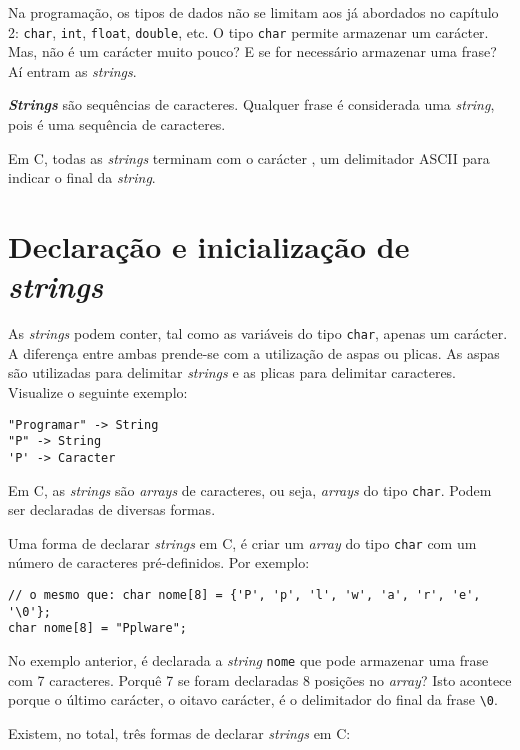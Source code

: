 Na programação, os tipos de dados não se limitam aos já abordados no capítulo 2: \texttt{char}, \texttt{int}, \texttt{float}, \texttt{double}, etc. O tipo \texttt{char} permite armazenar um carácter. Mas, não é um carácter muito pouco? E se for necessário armazenar uma frase? Aí entram as \textit{strings}.

\begin{defi}
\textbf{\textit{Strings}} são sequências de caracteres. Qualquer frase é considerada uma \textit{string}, pois é uma sequência de caracteres.
\end{defi}

Em C, todas as \textit{strings} terminam com o carácter , um delimitador ASCII para indicar o final da \textit{string}.

\section{Declaração e inicialização de \textit{strings}}

As \textit{strings} podem conter, tal como as variáveis do tipo \texttt{char}, apenas um carácter. A diferença entre ambas prende-se com a utilização de aspas ou plicas. As aspas são utilizadas para delimitar \textit{strings} e as plicas para delimitar caracteres. Visualize o seguinte exemplo:

\begin{lstlisting}
"Programar" -> String
"P" -> String
'P' -> Caracter
\end{lstlisting}

Em C, as \textit{strings} são \textit{arrays} de caracteres, ou seja, \textit{arrays} do tipo \texttt{char}. Podem ser declaradas de diversas formas.

Uma forma de declarar \textit{strings} em C, é criar um \textit{array} do tipo \texttt{char} com um número de caracteres pré-definidos. Por exemplo:

\begin{lstlisting}
// o mesmo que: char nome[8] = {'P', 'p', 'l', 'w', 'a', 'r', 'e', '\0'};
char nome[8] = "Pplware";
\end{lstlisting}

No exemplo anterior, é declarada a \textit{string} \texttt{nome} que pode armazenar uma frase com 7 caracteres. Porquê 7 se foram declaradas 8 posições no \textit{array}? Isto acontece porque o último carácter, o oitavo carácter, é o delimitador do final da frase \texttt{\textbackslash 0}.

Existem, no total, três formas de declarar \textit{strings} em C: 

